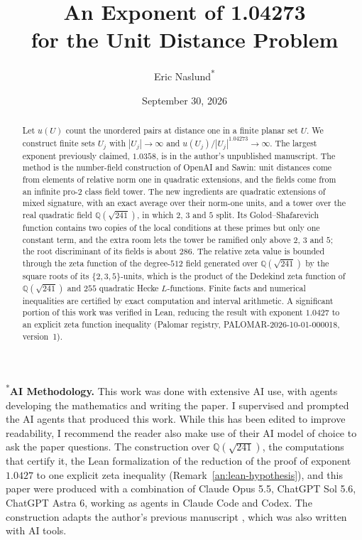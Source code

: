 \documentclass[11pt]{amsart}
\title[The Unit Distance Problem]{An Exponent of 1.04273\\for the Unit Distance Problem}
\author[Eric Naslund]{Eric Naslund\textsuperscript{*}}
\date{September 30, 2026}
\numberwithin{equation}{section}
\theoremstyle{definition}
\theoremstyle{remark}
\newcommand{\Q}{\mathbb Q}
\begin{document}
\begin{abstract}
Let $u(U)$ count the unordered pairs at distance one in a finite planar
set $U$. We construct finite sets $U_j$ with $|U_j|\to\infty$ and
$u(U_j)/|U_j|^{1.04273}\to\infty$. The largest exponent previously
claimed, $1.0358$, is in the author's unpublished manuscript. The
method is the number-field construction of OpenAI and Sawin: unit
distances come from elements of relative norm one in quadratic
extensions, and the fields come from an infinite pro-$2$ class field
tower. The new ingredients are quadratic extensions of mixed signature,
with an exact average over their norm-one units, and a tower over the
real quadratic field $\Q(\sqrt{241})$, in which $2$, $3$ and $5$ split.
Its Golod--Shafarevich function contains two copies of the local
conditions at these primes but only one constant term, and the extra room
lets the tower be ramified only above $2$, $3$ and $5$; the root
discriminant of its fields is about $286$. The relative zeta value is bounded through the zeta function of the
degree-$512$ field generated over $\Q(\sqrt{241})$ by the square roots of
its $\{2,3,5\}$-units, which is the product of the Dedekind zeta function
of $\Q(\sqrt{241})$ and $255$ quadratic Hecke $L$-functions. Finite facts and numerical
inequalities are certified by exact computation and interval arithmetic. A significant portion of this work was verified in Lean, reducing the result with exponent $1.0427$ to an explicit zeta function inequality (Palomar registry, PALOMAR-2026-10-01-000018, version~1).
\end{abstract}
\maketitle

{\noindent\small\textsuperscript{*}\textbf{AI Methodology.} This work was done with extensive AI use, with agents developing the mathematics and writing the paper. I supervised and prompted the AI agents that produced this work. While this has been edited to improve readability, I recommend the reader also make use of their AI model of choice to ask the paper questions. The
construction over $\Q(\sqrt{241})$, the computations that certify it, the
Lean formalization of the reduction of the proof of exponent $1.0427$ to one
explicit zeta inequality (Remark~\ref{an:lean-hypothesis}), and this paper
were produced with a combination of Claude Opus 5.5, ChatGPT Sol 5.6, ChatGPT Astra 6, working as agents in Claude Code and Codex. The construction adapts the author's previous manuscript
\cite{Naslund0358}, which was also written with AI tools.\par}
\medskip


\tableofcontents










\end{document}
